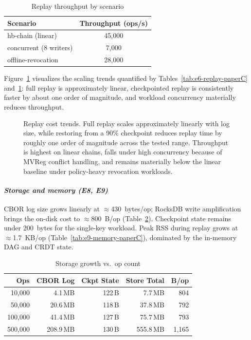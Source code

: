 \documentclass[10pt,journal,compsoc]{IEEEtran}
\begin{document}
\begin{table}[htbp]
\centering
\caption{Replay throughput by scenario}
\label{tab:e7-throughput-paperC}
\begin{tabular}{@{}lc@{}}
\toprule
\textbf{Scenario} & \textbf{Throughput (ops/s)} \\
\midrule
hb-chain (linear)           & 45,000 \\
concurrent (8 writers)      & 7,000  \\
offline-revocation          & 28,000 \\
\bottomrule
\end{tabular}
\end{table}

Figure~\ref{fig:eval-replay-throughput-paperC} visualizes the scaling trends quantified by Tables~\ref{tab:e6-replay-paperC} and~\ref{tab:e7-throughput-paperC}: full replay is approximately linear, checkpointed replay is consistently faster by about one order of magnitude, and workload concurrency materially reduces throughput.

\begin{figure}[t]
\centering

\caption{Replay cost trends. Full replay scales approximately linearly with log size, while restoring from a 90\% checkpoint reduces replay time by roughly one order of magnitude across the tested range. Throughput is highest on linear chains, falls under high concurrency because of MVReg conflict handling, and remains materially below the linear baseline under policy-heavy revocation workloads.}
\label{fig:eval-replay-throughput-paperC}
\end{figure}

\paragraph*{\textit{Storage and memory (E8, E9)}}
CBOR log size grows linearly at $\approx$430~bytes/op; RocksDB write amplification brings the on-disk cost to $\approx$800~B/op (Table~\ref{tab:e8-storage-paperC}). Checkpoint state remains under 200~bytes for the single-key workload. Peak RSS during replay grows at $\approx$1.7~KB/op (Table~\ref{tab:e9-memory-paperC}), dominated by the in-memory DAG and CRDT state.

\begin{table}[htbp]
\centering
\caption{Storage growth vs.\ op count}
\label{tab:e8-storage-paperC}
\begin{tabular}{@{}rrrrr@{}}
\toprule
\textbf{Ops} & \textbf{CBOR Log} & \textbf{Ckpt State} & \textbf{Store Total} & \textbf{B/op} \\
\midrule
10,000  & 4.1\,MB   & 122\,B & 7.7\,MB   & 804 \\
50,000  & 20.6\,MB  & 118\,B & 37.8\,MB  & 792 \\
100,000 & 41.4\,MB  & 127\,B & 75.7\,MB  & 793 \\
500,000 & 208.9\,MB & 130\,B & 555.8\,MB & 1,165 \\
\bottomrule
\end{tabular}
\end{table}
\end{document}
